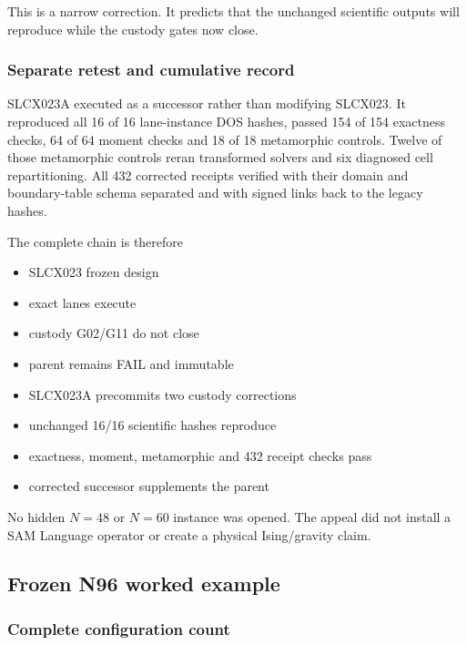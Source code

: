 This is a narrow correction. It predicts that the unchanged scientific
outputs will reproduce while the custody gates now close.

\subsubsection{Separate retest and cumulative
record}\label{viii-ch03-separate-retest-and-cumulative-record}

SLCX023A executed as a successor rather than modifying SLCX023. It
reproduced all 16 of 16 lane-instance DOS hashes, passed 154 of 154
exactness checks, 64 of 64 moment checks and 18 of 18 metamorphic
controls. Twelve of those metamorphic controls reran transformed solvers
and six diagnosed cell repartitioning. All 432 corrected receipts
verified with their domain and boundary-table schema separated and with
signed links back to the legacy hashes.

The complete chain is therefore

\begin{itemize}
\tightlist
\item
  SLCX023 frozen design
\item
  exact lanes execute
\item
  custody G02/G11 do not close
\item
  parent remains FAIL and immutable
\item
  SLCX023A precommits two custody corrections
\item
  unchanged 16/16 scientific hashes reproduce
\item
  exactness, moment, metamorphic and 432 receipt checks pass
\item
  corrected successor supplements the parent
\end{itemize}

No hidden \(N=48\) or \(N=60\) instance was opened. The appeal did not
install a SAM Language operator or create a physical Ising/gravity
claim.

\subsection{Frozen N96 worked example}\label{viii-ch03-frozen-n96-worked-example}

\subsubsection{Complete configuration
count}\label{viii-ch03-complete-configuration-count}

